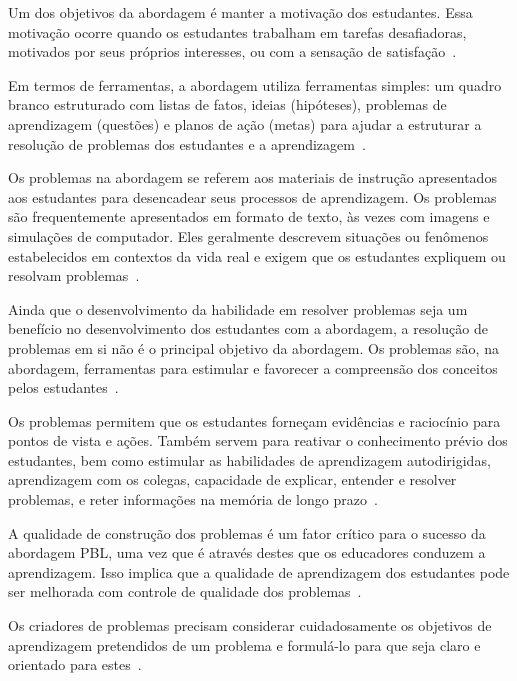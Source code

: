 Um dos objetivos da abordagem é manter a motivação
dos estudantes.
Essa motivação ocorre quando os estudantes trabalham em
tarefas desafiadoras, motivados por seus próprios interesses,
ou com a sensação de satisfação~\cite{hmelo2004problem}.

Em termos de ferramentas, a abordagem utiliza ferramentas simples:
um quadro branco estruturado com listas de fatos,
ideias (hipóteses), problemas de aprendizagem (questões)
e planos de ação (metas) para ajudar a estruturar a
resolução de problemas dos estudantes e a
aprendizagem~\cite{hmelo2004problem}. 

Os problemas na abordagem se referem aos materiais de instrução apresentados
aos estudantes para desencadear seus processos de aprendizagem.
Os problemas são frequentemente apresentados em formato de texto,
às vezes com imagens e simulações de computador.
Eles geralmente descrevem situações ou fenômenos estabelecidos
em contextos da vida real e exigem que os estudantes expliquem ou
resolvam problemas~\cite{hmelo2004problem}.

Ainda que o desenvolvimento da habilidade em resolver problemas seja um benefício
no desenvolvimento dos estudantes com a abordagem, a resolução de problemas em si
não é o principal objetivo da abordagem.
Os problemas são, na abordagem, ferramentas para estimular e
favorecer a compreensão dos conceitos pelos
estudantes~\cite{wood2003problem, amos1998problem}.

Os problemas permitem que os estudantes forneçam evidências
e raciocínio para pontos de vista e ações.
Também servem para reativar o conhecimento prévio dos
estudantes, bem como estimular as habilidades de aprendizagem
autodirigidas, aprendizagem com os colegas,
capacidade de explicar, entender e resolver problemas, e
reter informações na memória de longo
prazo~\cite{des1999delphi, azer2012twelve}.

A qualidade de construção dos problemas é um fator crítico para o
sucesso da abordagem \ac{PBL}, uma vez que é através destes
que os educadores conduzem a
aprendizagem.
Isso implica que a qualidade de aprendizagem dos estudantes
pode ser melhorada com controle de qualidade dos
problemas~\cite{santos2009analisa,des1999delphi,dolmans1997seven}.

Os criadores de problemas precisam considerar cuidadosamente
os objetivos de aprendizagem pretendidos de um problema
e formulá-lo para que seja claro e
orientado para estes~\cite{sockalingam2011student}.


